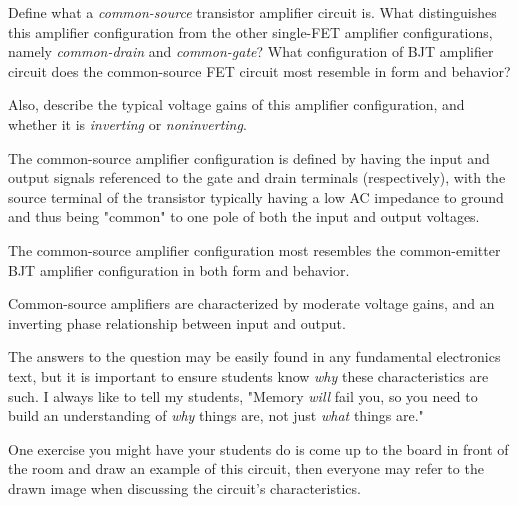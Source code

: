 

Define what a {\it common-source} transistor amplifier circuit is.  What distinguishes this amplifier configuration from the other single-FET amplifier configurations, namely {\it common-drain} and {\it common-gate}?  What configuration of BJT amplifier circuit does the common-source FET circuit most resemble in form and behavior?

Also, describe the typical voltage gains of this amplifier configuration, and whether it is {\it inverting} or {\it noninverting}.







The common-source amplifier configuration is defined by having the input and output signals referenced to the gate and drain terminals (respectively), with the source terminal of the transistor typically having a low AC impedance to ground and thus being "common" to one pole of both the input and output voltages.  

The common-source amplifier configuration most resembles the common-emitter BJT amplifier configuration in both form and behavior. 

Common-source amplifiers are characterized by moderate voltage gains, and an inverting phase relationship between input and output.







The answers to the question may be easily found in any fundamental electronics text, but it is important to ensure students know {\it why} these characteristics are such.  I always like to tell my students, "Memory {\it will} fail you, so you need to build an understanding of {\it why} things are, not just {\it what} things are."

One exercise you might have your students do is come up to the board in front of the room and draw an example of this circuit, then everyone may refer to the drawn image when discussing the circuit's characteristics.




